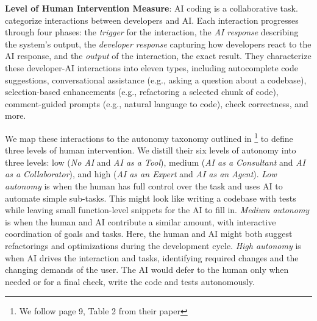 \textbf{Level of Human Intervention Measure}: AI coding is a collaborative task. \citet{treude2025developers} categorize interactions between developers and AI. Each interaction progresses through four phases: the \textit{trigger} for the interaction, the \textit{AI response} describing the system's output, the \textit{developer response} capturing how developers react to the AI response, and the \textit{output} of the interaction, the exact result. They characterize these developer-AI interactions into eleven types, including autocomplete code suggestions, conversational assistance (e.g., asking a question about a codebase), selection-based enhancements (e.g., refactoring a selected chunk of code), comment-guided prompts (e.g., natural language to code), check correctness, and more. 

We map these interactions to the autonomy taxonomy outlined in \citet{morris2023levels}\footnote{We follow page 9, Table 2 from their paper} to define three levels of human intervention. We distill their six levels of autonomy into three levels: low (\textit{No AI} and \textit{AI as a Tool}), medium (\textit{AI as a Consultant} and \textit{AI as a Collaborator}), and high (\textit{AI as an Expert} and \textit{AI as an Agent}). \textit{Low autonomy} is when the human has full control over the task and uses AI to automate simple sub-tasks. This might look like writing a codebase with tests while leaving small function-level snippets for the AI to fill in. \textit{Medium autonomy} is when the human and AI contribute a similar amount, with interactive coordination of goals and tasks. Here, the human and AI might both suggest refactorings and optimizations during the development cycle. \textit{High autonomy} is when AI drives the interaction and tasks, identifying required changes and the changing demands of the user. The AI would defer to the human only when needed or for a final check, write the code and tests autonomously.



